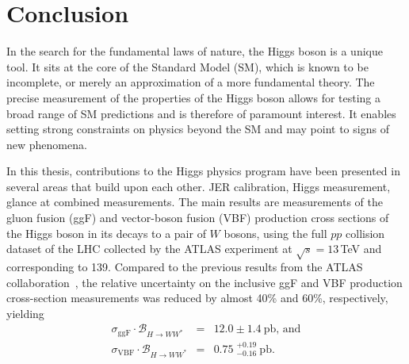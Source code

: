 \chapter{Conclusion}
\label{chap:conclusion}
In the search for the fundamental laws of nature, the Higgs boson is a unique tool. 
It sits at the core of the Standard Model (SM), which is known to be incomplete, or merely an approximation of a more fundamental theory. 
The precise measurement of the properties of the Higgs boson allows for testing a broad range of SM predictions and is therefore of paramount interest.
It enables setting strong constraints on physics beyond the SM and may point to signs of new phenomena. %

In this thesis, contributions to the Higgs physics program have been presented in several areas that build upon each other. 
JER calibration, Higgs measurement, glance at combined measurements. 
The main results are measurements of the gluon fusion (ggF) and vector-boson fusion (VBF) production cross sections of the Higgs boson in its decays to a pair of $W$ bosons, using the full \RunTwo $pp$ collision dataset of the LHC collected by the ATLAS experiment at $\sqrt{s} = 13\,$TeV and corresponding to 139\ifb. 
Compared to the previous \RunTwo results from the ATLAS collaboration~\cite{HIGG-2016-07}, the relative uncertainty on the inclusive ggF and VBF production cross-section measurements was reduced by almost 40\% and 60\%, respectively, yielding 
\begin{eqnarray*}
    \sigma_{\mathrm{ggF}} \cdot \mathcal{B}_{H \to WW^{\ast}} &=& 12.0 \pm 1.4~\mathrm{pb}, \,\text{and} \\
    \sigma_{\mathrm{VBF}} \cdot \mathcal{B}_{H \to WW^{\ast}} &=& 0.75\;^{+0.19}_{-0.16}~\mathrm{pb}.
\end{eqnarray*}
